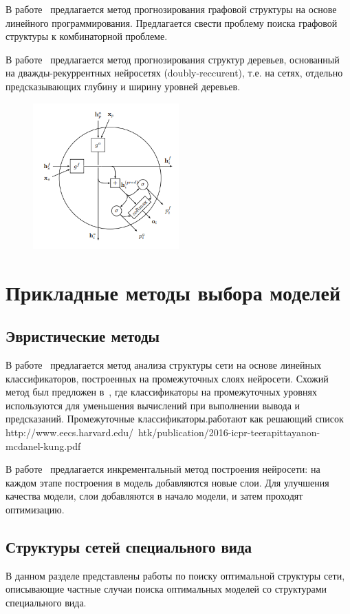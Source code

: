 В работе~\cite{jaakkola2010learning} предлагается метод прогнозирования графовой структуры на основе линейного программирования. Предлагается свести проблему поиска графовой структуры к комбинаторной проблеме.

В работе~\cite{double_rnn} предлагается метод прогнозирования структур деревьев, основанный на дважды-рекуррентных нейросетях (doubly-reccurent), т.е. на сетях, отдельно предсказывающих глубину и ширину уровней деревьев.
\begin{figure}[H]
\includegraphics[width=0.5\textwidth]{./plots/arch_review_figs/jaakkola.png}
\end{figure}


\section{Прикладные методы выбора моделей}
\subsection*{Эвристические методы}
В работе~\cite{layer_probe} предлагается метод анализа структуры сети на основе линейных классификаторов, построенных на промежуточных слоях нейросети.
Схожий метод был предложен в~\cite{branches}, где классификаторы на промежуточных уровнях используются для уменьшения вычислений при выполнении вывода и предсказаний.
Промежуточные классификаторы.работают как решающий список
http://www.eecs.harvard.edu/~htk/publication/2016-icpr-teerapittayanon-mcdanel-kung.pdf

В работе~\cite{nn_inc} предлагается инкрементальный метод построения нейросети: на каждом этапе построения в модель добавляются новые слои. Для улучшения качества модели, слои добавляются в начало модели, и затем проходят оптимизацию.

\subsection*{Структуры сетей специального вида}
В данном разделе представлены работы по поиску оптимальной структуры сети, описывающие частные случаи поиска оптимальных моделей со структурами специального вида.

